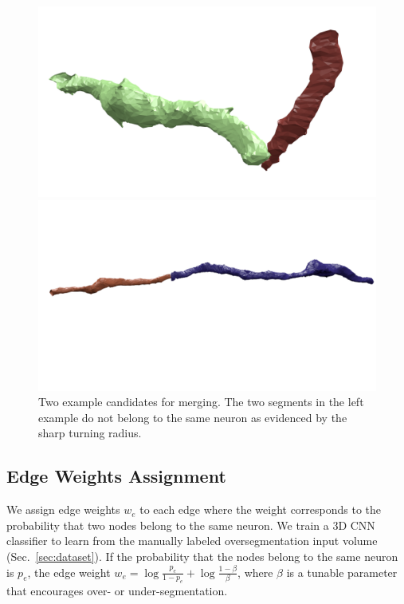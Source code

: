 \begin{figure}[t]
	\begin{minipage}{0.45\linewidth}
		\includegraphics[width=\linewidth]{./figures/constraint_error.png}
	\end{minipage}
	\hfill
	\begin{minipage}{0.45\linewidth}
		\includegraphics[width=\linewidth]{./figures/constraint_success.png}
	\end{minipage}
	\caption{Two example candidates for merging. The two segments in the left example do not belong to the same neuron as evidenced by the sharp turning radius.}
	\label{fig:turn-radii}
\end{figure}
\subsection{Edge Weights Assignment}
\label{sec:edge-weights}
We assign edge weights $w_e$ to each edge where the weight corresponds to the probability that two nodes belong to the same neuron.
We train a 3D CNN classifier to learn from the manually labeled oversegmentation input volume (Sec.~\ref{sec:dataset}).
If the probability that the nodes belong to the same neuron is $p_e$, the edge weight $w_e = \log{\frac{p_e}{1 - p_e}} + \log{\frac{1 - \beta}{\beta}}$, where $\beta$ is a tunable parameter that encourages over- or under-segmentation.

